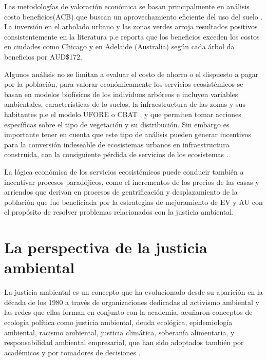 \documentclass[12pt,]{book}
\begin{document}
Las metodologías de valoración económica se basan principalmente en
análisis costo beneficios(ACB) que buscan un aprovechamiento eficiente
del uso del suelo \citep{bolund_ecosystem_1999}. La inversión en el
arbolado urbano y las zonas verdes arroja resultados positivos
consistentemente en la literatura p.e \citep{mcpherson_quantifying_1997}
reporta que los beneficios exceden los costos en ciudades como Chicago y
en Adelaide (Australia) según \citep{killicoat_economic_2002} cada árbol
da beneficios por AUD\$172.

Algunos análisis no se limitan a evaluar el costo de ahorro o el
dispuesto a pagar por la población, para valorar económicamente los
servicios ecosistémicos se basan en modelos biofísicos de los individuos
arbóreos e incluyen variables ambientales, características de lo suelos,
la infraestructura de las zonas y sus habitantes
\citep{nelson_modeling_2009} p.e el modelo UFORE
\citep{nowak_urban_2000} o CBAT \citep{mcpherson_quantifying_1997} , y
que permiten tomar acciones específicas sobre el tipo de vegetación y su
distribución. Sin embargo es importante tener en cuenta que este tipo de
análisis pueden generar incentivos para la conversión indeseable de
ecosistemas urbanos en infraestructura construida, con la consiguiente
pérdida de servicios de los ecosistemas
\citep{gomez-baggethun_classifying_2013}.

La lógica económica de los servicios ecosistémicos puede conducir
también a incentivar procesos paradójicos, como el incrementos de los
precios de las casas y arriendos que derivan en procesos de
gentrificación y desplazamiento de la población que fue beneficiada por
la estrategias de mejoramiento de EV y AU con el propósito de resolver
problemas relacionados con la justicia ambiental.
\citep{wolch_urban_2014}

\section{La perspectiva de la justicia
ambiental}\label{la-perspectiva-de-la-justicia-ambiental}

La justicia ambiental es un concepto que ha evolucionado desde su
aparición en la década de los 1980 a través de organizaciones dedicadas
al activismo ambiental y las redes que ellas forman en conjunto con la
academia, acuñaron conceptos de ecología política como justicia
ambiental, deuda ecológica, epidemiología ambiental, racismo ambiental,
justicia climática, soberanía alimentaria, y responsabilidad ambiental
empresarial, que han sido adoptados también por académicos y por
tomadores de decisiones
\citep{martinez_alier_between_2014, cerda_origen_2011}.
\end{document}
